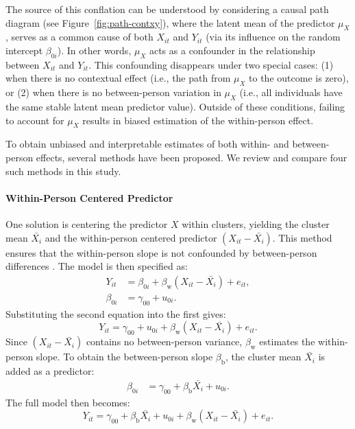 The source of this conflation can be understood by considering a causal path diagram (see Figure~\ref{fig:path-contxy}), where the latent mean of the predictor \( \mu_X  \), serves as a common cause of both \( X_{it} \) and \( Y_{it} \) (via its influence on the random intercept \( \beta_{0i} \)). In other words, \( \mu_X \) acts as a confounder in the relationship between \( X_{it} \) and \( Y_{it} \). This confounding disappears under two special cases: (1) when there is no contextual effect (i.e., the path from \( \mu_X \) to the outcome is zero), or (2) when there is no between-person variation in \( \mu_X \) (i.e., all individuals have the same stable latent mean predictor value). Outside of these conditions, failing to account for \( \mu_X \) results in biased estimation of the within-person effect.

To obtain unbiased and interpretable estimates of both within- and between-person effects, several methods have been proposed. We review and compare four such methods in this study.

\paragraph{Within-Person Centered Predictor}

One solution is centering the predictor $X$ within clusters, yielding the cluster mean $\bar{X_i}$ and the within-person centered predictor $(X_{it} - \bar{X_i})$. This method ensures that the within-person slope is not confounded by between-person differences \parencite[e.g.,][]{hoffman_longitudinal_2015, kreft_effect_1995, raudenbush_hierarchical_2002}. The model is then specified as:
\begin{align}
Y_{it} &= \beta_{0i} + \beta_\text{w} (X_{it}- \bar{X_i}) + e_{it},  \\
\beta_{0i} &= \gamma_{00} + u_{0i}.
\end{align}
Substituting the second equation into the first gives:
\begin{equation}
\label{eqn:method-M2-linear}
Y_{it} = \gamma_{00} + u_{0i} + \beta_\text{w} (X_{it}- \bar{X_i}) + e_{it}.
\end{equation}
Since $(X_{it} - \bar{X_i})$ contains no between-person variance, $\beta_\text{w}$ estimates the within-person slope. To obtain the between-person slope $\beta_\text{b}$, the cluster mean $\bar{X_i}$ is added as a predictor:
\begin{align}
\beta_{0i} &= \gamma_{00} + \beta_\text{b} \bar{X_i} + u_{0i}.
\end{align}
The full model then becomes:
\begin{equation}
\label{eqn:method-M4-linear}
Y_{it} = \gamma_{00} + \beta_\text{b} \bar{X_i} + u_{0i} + \beta_\text{w} (X_{it} - \bar{X_i}) + e_{it}.
\end{equation}
